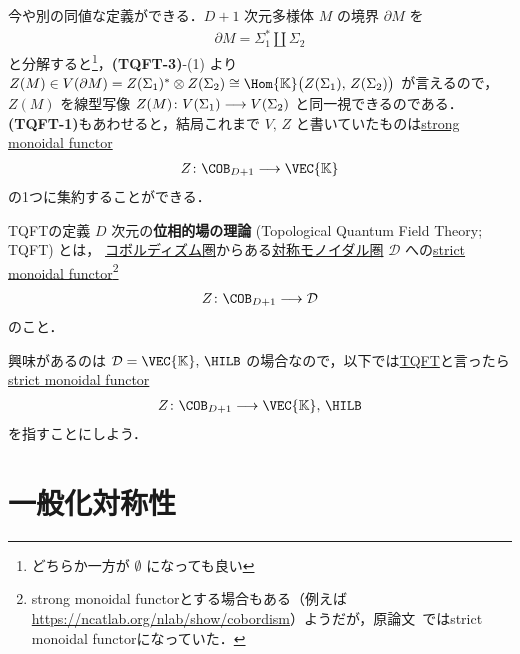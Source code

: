 \documentclass[TQFT_main]{subfiles}
\begin{document}
今や別の同値な定義ができる．$D+1$ 次元多様体 $M$ の境界 $\partial M$ を
\begin{align}
    \partial M = \Sigma_1^* \amalg \Sigma_2
\end{align}
と分解すると\footnote{どちらか一方が $\emptyset$ になっても良い}，\textsf{\textbf{(TQFT-3)}}-(1) より
$Z(M) \in V(\partial M) = Z(\Sigma_1)^* \otimes Z(\Sigma_2) \cong \Hom{\mathbb{K}} \bigl( Z(\Sigma_1),\, Z(\Sigma_2) \bigr)$ が言えるので，$Z(M)$ を線型写像 $Z(M) \colon V(\Sigma_1) \longrightarrow V(\Sigma_2)$ と同一視できるのである．
\textsf{\textbf{(TQFT-1)}}もあわせると，結局これまで $V,\, Z$ と書いていたものは\hyperref[def:monidal-functor]{strong monoidal functor}
\begin{align}
    Z \colon \COB_{D+1} \lto \VEC{\mathbb{K}}
\end{align}
の1つに集約することができる．

\begin{mydef}[label=def:TQFT]{TQFTの定義}
    $D$ 次元の\textbf{位相的場の理論} (Topological Quantum Field Theory; TQFT) とは，
    \hyperref[Cob-string]{コボルディズム圏}からある\hyperref[def:braided-monoidal]{対称モノイダル圏} $\mathcal{D}$ への\hyperref[def:monidal-functor]{strict monoidal functor}\footnote{strong monoidal functorとする場合もある（例えば\url{https://ncatlab.org/nlab/show/cobordism}）ようだが，原論文~\cite{Atiyah1988tqft}ではstrict monoidal functorになっていた．}
    \begin{align}
        Z \colon \COB_{D+1} \lto \mathcal{D}
    \end{align}
    のこと．
\end{mydef}

興味があるのは $\mathcal{D} = \VEC{\mathbb{K}},\, \HILB$ の場合なので，以下では\hyperref[ax:Atiyah-TQFT]{TQFT}と言ったら\hyperref[def:monidal-functor]{strict monoidal functor}
\begin{align}
    Z \colon \COB_{D+1} \lto \VEC{\mathbb{K}},\, \HILB
\end{align}
を指すことにしよう．

\section{一般化対称性}
\end{document}
